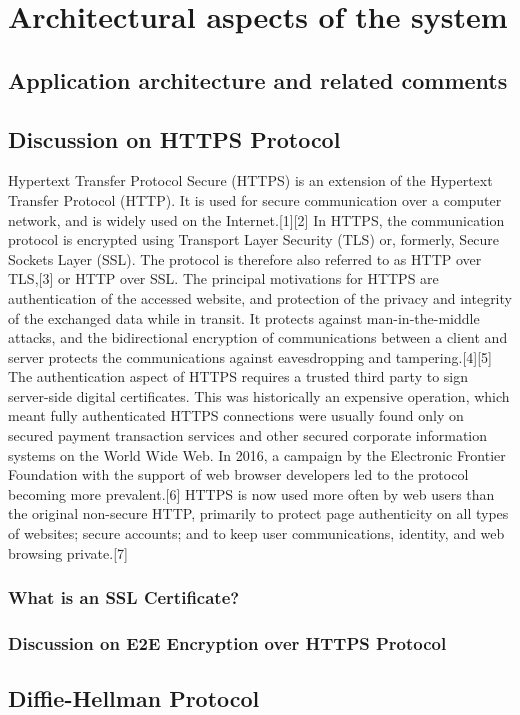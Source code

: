 \chapter{Architectural aspects of the system}\label{ch:architectural-aspects-of-the-system}


\section{Application architecture and related comments}\label{sec:application-architecture-and-related-comments}




\section{Discussion on HTTPS Protocol}\label{sec:discussion-on-https-protocol}
Hypertext Transfer Protocol Secure (HTTPS) is an extension of the Hypertext Transfer Protocol (HTTP).
It is used for secure communication over a computer network, and is widely used on the Internet.[1][2]
In HTTPS, the communication protocol is encrypted using Transport Layer Security (TLS) or, formerly, Secure Sockets Layer (SSL).
The protocol is therefore also referred to as HTTP over TLS,[3] or HTTP over SSL.
The principal motivations for HTTPS are authentication of the accessed website, and protection of the privacy and integrity
of the exchanged data while in transit.
It protects against man-in-the-middle attacks, and the bidirectional encryption of communications between a client and
server protects the communications against eavesdropping and tampering.[4][5]
The authentication aspect of HTTPS requires a trusted third party to sign server-side digital certificates.
This was historically an expensive operation, which meant fully authenticated HTTPS connections were usually found only
on secured payment transaction services and other secured corporate information systems on the World Wide Web.
In 2016, a campaign by the Electronic Frontier Foundation with the support of web browser developers led to the protocol
becoming more prevalent.[6] HTTPS is now used more often by web users than the original non-secure HTTP, primarily to protect
page authenticity on all types of websites;
secure accounts;
and to keep user communications, identity, and web browsing private.[7]

\subsection{What is an SSL Certificate?}\label{subsec:what-is-an-ssl-certificate?}

\subsection{Discussion on E2E Encryption over HTTPS Protocol}\label{subsec:discussion-on-e2e-encryption-over-https-protocol}


\section{Diffie-Hellman Protocol}\label{sec:diffie-hellman-protocol}
